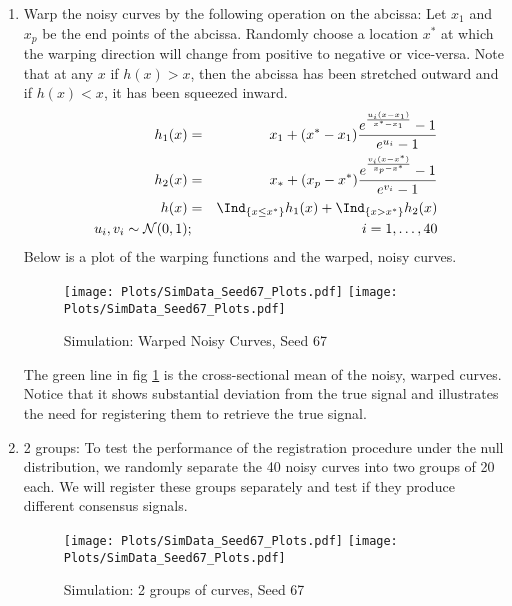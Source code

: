 \begin{enumerate}
\item Warp the noisy curves by the following operation on the abcissa: Let $x_1$ and $x_p$ be the end points of the abcissa. Randomly choose a location $x^*$ at which the warping direction will change from positive to negative or vice-versa. Note that at any $x$ if $h(x) > x$, then the abcissa has been stretched outward and if $h(x) < x$, it has been squeezed inward. 
\begin{eqnarray*}
h_1(x) &=& x_1 + (x^* - x_1) \frac{e^{\frac{u_i(x - x_1)}{x^* - x_1}} - 1}{e^{u_i} - 1} \\
h_2(x) &=& x_* + (x_p - x^*) \frac{e^{\frac{v_i(x - x^*)}{x_p - x^*}} - 1}{e^{v_i} - 1} \\
h(x) &=& \Ind_{\{ x \le x^*\}} h_1(x) + \Ind_{\{ x > x^*\}} h_2(x) \\
  \ u_i, v_i \sim \mathcal{N}(0, 1)  &;& i = 1, \dots, 40
\end{eqnarray*}
Below is a plot of the warping functions and the warped, noisy curves.
\begin{figure}[H]
\begin{center}
\texttt{[image: Plots/SimData\_Seed67\_Plots.pdf]}
\texttt{[image: Plots/SimData\_Seed67\_Plots.pdf]}
\end{center}
\caption{Simulation: Warped Noisy Curves, Seed 67}
\label{fig:FigSim_Warped}
\end{figure}
The green line in fig \ref{fig:FigSim_Warped} is the cross-sectional mean of the noisy, warped curves. Notice that it shows substantial deviation from the true signal and illustrates the need for registering them to retrieve the true signal.

\item 2 groups: To test the performance of the registration procedure under the null distribution, we randomly separate the 40 noisy curves into two groups of 20 each. We will register these groups separately and test if they produce different consensus signals. 
\begin{figure}[H]
\begin{center}
\texttt{[image: Plots/SimData\_Seed67\_Plots.pdf]}
\texttt{[image: Plots/SimData\_Seed67\_Plots.pdf]}
\end{center}
\caption{Simulation: 2 groups of curves, Seed 67}
\label{fig:FigSim_2groups}
\end{figure}

\end{enumerate}

